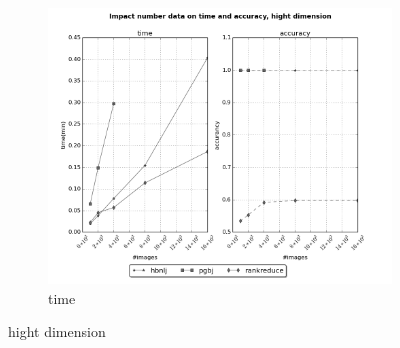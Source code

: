 \documentclass[10pt,a4paper]{article}
\begin{document}
\begin{figure}[ht]
\begin{subfigure}[b]{0.3\textwidth}
                 \includegraphics[width=\textwidth]{../graph/surf/time.png} 
                \caption{time}
        \end{subfigure}%
        \caption{hight dimension}
  \end{figure}
  
   \newpage
\end{document}
